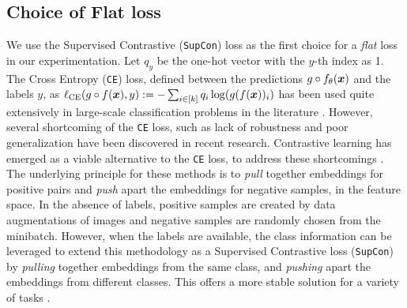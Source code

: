 \subsection{Choice of Flat loss}

We use the Supervised Contrastive \citep{2020supcon} (\texttt{SupCon}) loss as the first choice for a \emph{flat} loss in our experimentation. Let $q_y$ be the one-hot vector with the $y$-th index as 1. The Cross Entropy (\texttt{CE}) loss, defined between the predictions  $g\circ f_\theta({\bm{x}})$ and the labels $y$, as $\ell_{\text{CE}}(g\circ f({\bm{x}}), y) := - \sum_{i\in[k]}q_i\log(g(f({\bm{x}}))_i)$ has been used quite extensively in large-scale classification problems in the literature \citep{cubuk2019autoaugment, cubuk1909randaugment, kolesnikov2019large, xie2020self}.  However, several shortcoming of the \texttt{CE} loss, such as lack of robustness \citep{sukhbaatar2014training, zhang2018generalized} and poor generalization \citep{ elsayed2018large, liu2016large} have been discovered in recent research. Contrastive learning has emerged as a viable alternative to the \texttt{CE} loss, to address these shortcomings \citep{chen2020simple, wu2018unsupervised, henaff2020data, tian2020contrastive, hjelm2018learning, he2020momentum}. The underlying principle for these methods is to \emph{pull} together embeddings for positive pairs and \emph{push} apart the embeddings for negative samples, in the feature space. In the absence of labels, positive samples are created by data augmentations of images and negative samples are randomly chosen from the minibatch.  However, when the labels are available, the class information can be leveraged to extend this methodology as a Supervised Contrastive loss (\texttt{SupCon}) by \emph{pulling} together embeddings from the same class, and \emph{pushing} apart the embeddings from different classes. This offers a more stable solution for a variety of tasks \citep{2020supcon, 2021ssd,sun2022knnood}.




